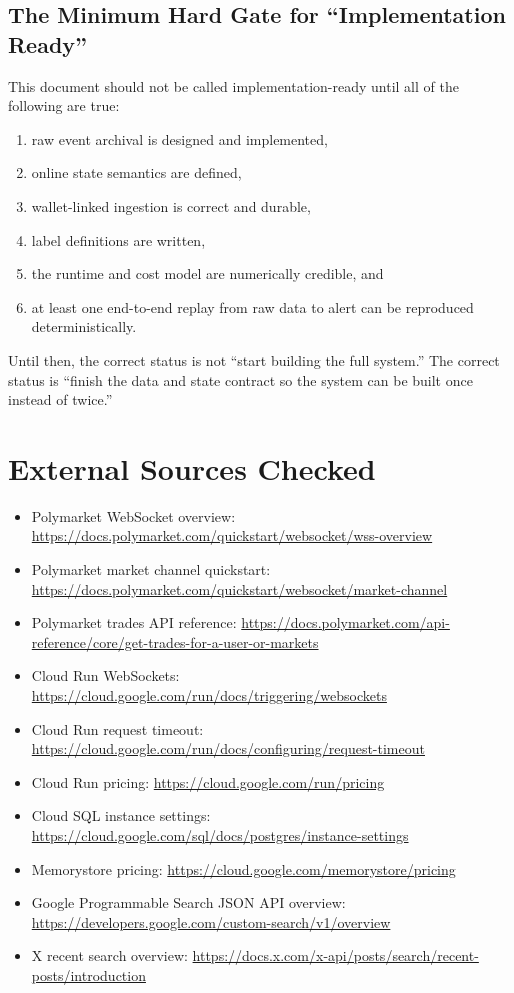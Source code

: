 \documentclass[11pt,letterpaper]{article}
\begin{document}
\subsection{The Minimum Hard Gate for ``Implementation Ready''}

This document should not be called implementation-ready until all of the following are true:

\begin{enumerate}[nosep]
    \item raw event archival is designed and implemented,
    \item online state semantics are defined,
    \item wallet-linked ingestion is correct and durable,
    \item label definitions are written,
    \item the runtime and cost model are numerically credible, and
    \item at least one end-to-end replay from raw data to alert can be reproduced deterministically.
\end{enumerate}

Until then, the correct status is not ``start building the full system.'' The correct status is ``finish the data and state contract so the system can be built once instead of twice.''

\section*{External Sources Checked}

\begin{itemize}[nosep]
    \item Polymarket WebSocket overview: \url{https://docs.polymarket.com/quickstart/websocket/wss-overview}
    \item Polymarket market channel quickstart: \url{https://docs.polymarket.com/quickstart/websocket/market-channel}
    \item Polymarket trades API reference: \url{https://docs.polymarket.com/api-reference/core/get-trades-for-a-user-or-markets}
    \item Cloud Run WebSockets: \url{https://cloud.google.com/run/docs/triggering/websockets}
    \item Cloud Run request timeout: \url{https://cloud.google.com/run/docs/configuring/request-timeout}
    \item Cloud Run pricing: \url{https://cloud.google.com/run/pricing}
    \item Cloud SQL instance settings: \url{https://cloud.google.com/sql/docs/postgres/instance-settings}
    \item Memorystore pricing: \url{https://cloud.google.com/memorystore/pricing}
    \item Google Programmable Search JSON API overview: \url{https://developers.google.com/custom-search/v1/overview}
    \item X recent search overview: \url{https://docs.x.com/x-api/posts/search/recent-posts/introduction}
\end{itemize}
\end{document}

